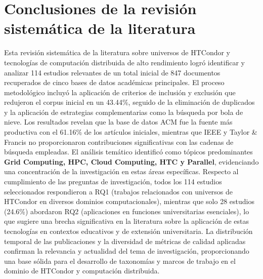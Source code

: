 \section{Conclusiones de la revisión sistemática de la literatura}
\noindent
Esta revisión sistemática de la literatura sobre universos de HTCondor y tecnologías de computación distribuida de alto rendimiento logró identificar y analizar 114 estudios relevantes de un total inicial de 847 documentos recuperados de cinco bases de datos académicas principales. El proceso metodológico incluyó la aplicación de criterios de inclusión y exclusión que redujeron el corpus inicial en un 43.44\%, seguido de la eliminación de duplicados y la aplicación de estrategias complementarias como la búsqueda por bola de nieve. Los resultados revelan que la base de datos ACM fue la fuente más productiva con el 61.16\% de los artículos iniciales, mientras que IEEE y Taylor \& Francis no proporcionaron contribuciones significativas con las cadenas de búsqueda empleadas. El análisis temático identificó como tópicos predominantes \textbf{Grid Computing, HPC, Cloud Computing, HTC y Parallel}, evidenciando una concentración de la investigación en estas áreas específicas. Respecto al cumplimiento de las preguntas de investigación, todos los 114 estudios seleccionados respondieron a RQ1 (trabajos relacionados con universos de HTCondor en diversos dominios computacionales), mientras que solo 28 estudios (24.6\%) abordaron RQ2 (aplicaciones en funciones universitarias esenciales), lo que sugiere una brecha significativa en la literatura sobre la aplicación de estas tecnologías en contextos educativos y de extensión universitaria. La distribución temporal de las publicaciones y la diversidad de métricas de calidad aplicadas confirman la relevancia y actualidad del tema de investigación, proporcionando una base sólida para el desarrollo de taxonomías y marcos de trabajo en el dominio de HTCondor y computación distribuida.

